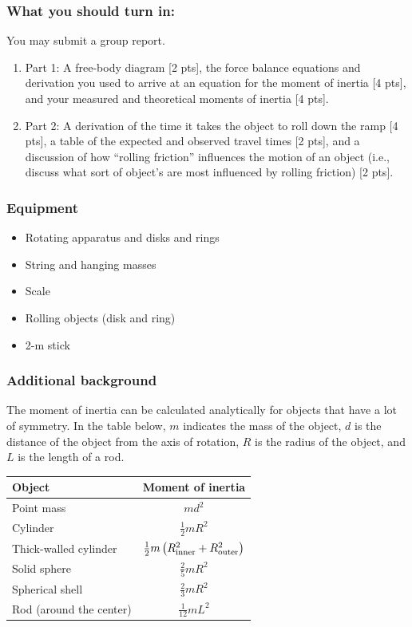 \documentclass[11pt,letterpaper]{article}
\begin{document}
\subsubsection*{What you should turn in:} 
You may submit a group report.
\begin{enumerate}
\setlength{\parskip}{3pt}
\item Part 1: A free-body diagram [2 pts], the force balance equations and derivation you used to arrive at an equation for the moment of inertia [4 pts], and your measured and theoretical moments of inertia [4 pts].
\item Part 2: A derivation of the time it takes the object to roll down the ramp [4 pts], a table of the expected and observed travel times [2 pts], and a discussion of how ``rolling friction'' influences the motion of an object (i.e., discuss what sort of object's are most influenced by rolling friction) [2 pts].
\end{enumerate}

\subsubsection*{Equipment}
\begin{itemize}
\setlength{\parskip}{3pt}
\item Rotating apparatus and disks and rings
\item String and hanging masses
\item Scale
\item Rolling objects (disk and ring)
\item 2-m stick
\end{itemize}

\pagebreak
\subsubsection*{Additional background}
The moment of inertia can be calculated analytically for objects that have a lot of symmetry. In the table below, $m$ indicates the mass of the object, $d$ is the distance of the object from the axis of rotation, $R$ is the radius of the object, and $L$ is the length of a rod.

\renewcommand{\arraystretch}{2}
\begin{table}[h]
\begin{tabular}{|l|c|}
\hline
Object & Moment of inertia\\
\hline
Point mass & $md^2$\\
Cylinder & $\frac{1}{2}mR^2$\\
Thick-walled cylinder & $\frac{1}{2}m\left(R_{\rm inner}^2+R_{\rm outer}^2\right)$\\
Solid sphere & $\frac{2}{5}mR^2$\\
Spherical shell & $\frac{2}{3}mR^2$\\
Rod (around the center) & $\frac{1}{12}mL^2$\\
\hline
\end{tabular}
\end{table}
\end{document}
